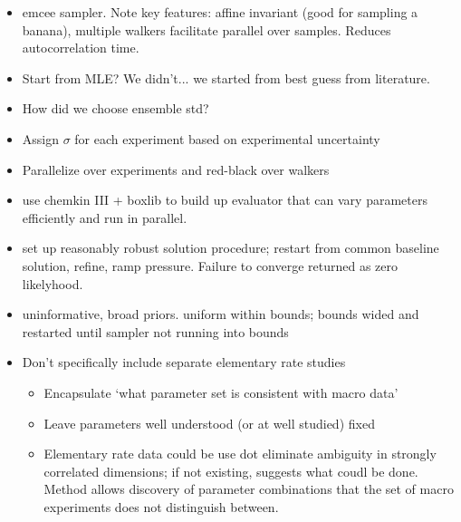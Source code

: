 \documentclass[preprint,3p,times,twocolumn]{elsarticle}
\begin{document}
\begin{itemize}
    \item emcee sampler. Note key features: affine invariant (good for sampling a banana), 
    multiple walkers facilitate parallel over samples. Reduces autocorrelation time. 
    \item Start from MLE? We didn't... we started from best guess from literature. 
    \item How did we choose ensemble std?
    \item Assign $\sigma$ for each experiment based on experimental uncertainty
    \item Parallelize over experiments and red-black over walkers
    \item use chemkin III + boxlib to build up evaluator that can vary
      parameters efficiently and run in parallel.
    \item set up reasonably robust solution procedure; restart from
      common baseline solution, refine, ramp pressure. Failure to
      converge returned as zero likelyhood.
    \item uninformative, broad priors. uniform within bounds; bounds
      wided and restarted until sampler not running into bounds
    \item Don't specifically include separate elementary rate studies
        \begin{itemize}
        \item Encapsulate `what parameter set is consistent with macro
          data'
        \item Leave parameters well understood (or at well studied)
          fixed
        \item Elementary rate data could be use dot eliminate
          ambiguity in strongly correlated dimensions; if not
          existing, suggests what coudl be done. Method allows
          discovery of parameter combinations that the set of macro
          experiments does not distinguish between.
 \end{itemize}
\end{itemize}
\end{document}
